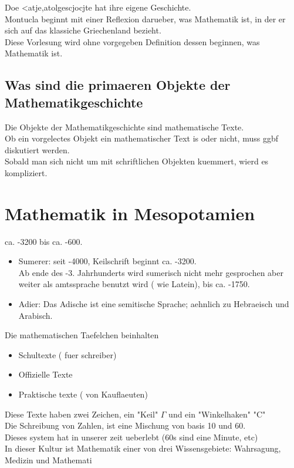 \documentclass[../main.tex]{subfiles}
\begin{document}
Doe <atje,atolgescjocjte hat ihre eigene Geschichte.\\
Montucla beginnt mit einer Reflexion darueber, was Mathematik ist, in der er sich auf das klassiche Griechenland bezieht.\\
Diese Vorlesung wird ohne vorgegeben Definition dessen beginnen, was Mathematik ist.
\subsection*{Was sind die primaeren Objekte der Mathematikgeschichte}
Die Objekte der Mathematikgeschichte sind mathematische Texte.\\
Ob ein vorgelectes Objekt ein mathematischer Text is oder nicht, muss ggbf diskutiert werden.\\
Sobald man sich nicht um mit schriftlichen Objekten kuemmert, wierd es kompliziert.
\section{Mathematik in Mesopotamien}
ca. -3200 bis ca. -600.\\
\begin{itemize}
\item Sumerer: seit -4000, Keilschrift beginnt ca. -3200.\\
	Ab ende des -3. Jahrhunderts wird sumerisch nicht mehr gesprochen aber weiter als amtssprache benutzt wird ( wie Latein), bis ca. -1750.
\item Adier: Das Adische ist eine semitische Sprache; aehnlich zu Hebraeisch und Arabisch.
\end{itemize}
Die mathematischen Taefelchen beinhalten
\begin{itemize}
\item Schultexte ( fuer schreiber) 
\item Offizielle Texte
\item Praktische texte ( von Kauflaeuten) 
\end{itemize}

Diese Texte haben zwei Zeichen, ein "Keil" $\Gamma$ und ein "Winkelhaken" "C"\\
Die Schreibung von Zahlen, ist eine Mischung von basis 10 und 60.\\
Dieses system hat in unserer zeit ueberlebt (60s sind eine Minute, etc) \\
In dieser Kultur ist Mathematik einer von drei Wissensgebiete: Wahrsagung, Medizin und Mathemati
\end{document}
